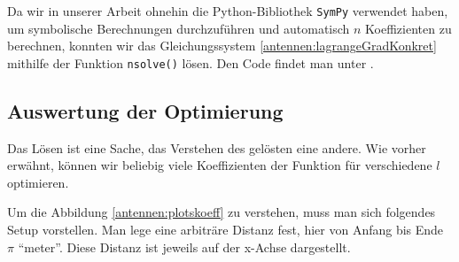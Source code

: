 Da wir in unserer Arbeit ohnehin die Python-Bibliothek \texttt{SymPy} verwendet haben, 
um symbolische Berechnungen durchzuführen und automatisch $n$ Koeffizienten zu berechnen, 
konnten wir das Gleichungssystem \eqref{antennen:lagrangeGradKonkret} mithilfe der Funktion 
\texttt{nsolve()} lösen.
Den Code findet man unter \cite{antennen:codeKoeff}.

\subsection{Auswertung der Optimierung\label{antennen:auswertung}}

Das Lösen ist eine Sache, das Verstehen des gelösten eine andere. Wie vorher erwähnt, können wir beliebig viele
Koeffizienten der Funktion für verschiedene $l$ optimieren.

Um die Abbildung \ref{antennen:plotskoeff} zu verstehen, muss man sich folgendes Setup vorstellen. 
Man lege eine arbiträre Distanz fest, hier von Anfang bis Ende $\pi$ 
``meter''. Diese Distanz ist jeweils auf der x-Achse dargestellt.

